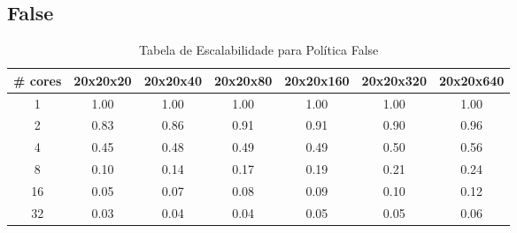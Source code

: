 \documentclass[a4paper, 12pt]{article}
\begin{document}
	\subsection{False}
	\begin{table}[h!]
		\centering
		\begin{tabular}{|c|c|c|c|c|c|c|}
			\hline
			\textbf{\# cores} & \textbf{20x20x20} & \textbf{20x20x40} & \textbf{20x20x80} & \textbf{20x20x160} & \textbf{20x20x320} & \textbf{20x20x640} \\ \hline
			1                 & 1.00              & 1.00              & 1.00              & 1.00               & 1.00               & 1.00               \\ \hline
			2                 & 0.83              & 0.86              & 0.91              & 0.91               & 0.90               & 0.96               \\ \hline
			4                 & 0.45              & 0.48              & 0.49              & 0.49               & 0.50               & 0.56               \\ \hline
			8                 & 0.10              & 0.14              & 0.17              & 0.19               & 0.21               & 0.24               \\ \hline
			16                & 0.05              & 0.07              & 0.08              & 0.09               & 0.10               & 0.12               \\ \hline
			32                & 0.03              & 0.04              & 0.04              & 0.05               & 0.05               & 0.06               \\ \hline
		\end{tabular}
		\caption{Tabela de Escalabilidade para Política False}
		\label{tab:Tabela de Escalabilidade para Política False} %
	\end{table}
	
	
	\FloatBarrier
	
\end{document}
